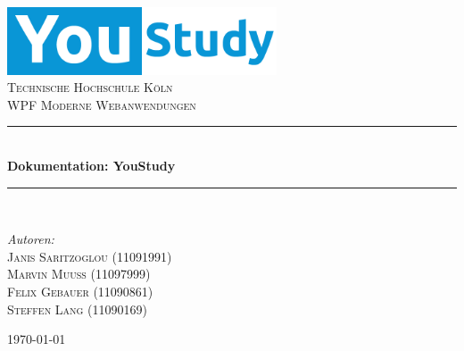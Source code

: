 \begin{titlepage}
\begin{center}

\includegraphics[width=0.60\textwidth]{./img/logo.png}\\[1cm]    
\textsc{\LARGE Technische Hochschule Köln}\\[1.5cm] %
\textsc{\Large WPF Moderne Webanwendungen}\\[0.5cm] %

\newcommand{\HRule}{\rule{\linewidth}{0.5mm}}
\HRule \\[0.4cm]
{ \huge \bfseries Dokumentation: YouStudy}\\[0.4cm]
\HRule \\[1.5cm]
\begin{minipage}{0.3\textwidth}
\emph{Autoren:}\\
\textsc{Janis Saritzoglou (11091991) \\ Marvin Muuß (11097999) \\ Felix Gebauer (11090861) \\ Steffen Lang (11090169)}
\end{minipage}
\hfill

\vfill
{\large \today}
\end{center}
\end{titlepage}
